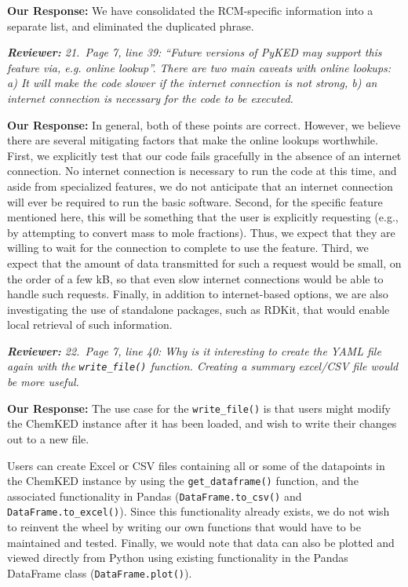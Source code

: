 \documentclass[a4paper,10pt]{elsarticle}
\newenvironment{reviewer}{\vspace{0.5\baselineskip}\begingroup\itshape\textbf{Reviewer:}}{\endgroup}
\newenvironment{response}{\textbf{Our Response:}}{\vspace{0.5\baselineskip}}
\begin{document}
\begin{response}
    We have consolidated the RCM-specific information into a separate list, and eliminated the
    duplicated phrase.
\end{response}

\begin{reviewer}
    21.~Page 7, line 39: ``Future versions of PyKED may support this feature via, e.g. online
    lookup''. There are two main caveats with online lookups: a) It will make the code slower if the
    internet connection is not strong, b) an internet connection is necessary for the code to be
    executed.
\end{reviewer}

\begin{response}
    In general, both of these points are correct. However, we believe there are several mitigating
    factors that make the online lookups worthwhile. First, we explicitly test that our code fails
    gracefully in the absence of an internet connection. No internet connection is necessary to run
    the code at this time, and aside from specialized features, we do not anticipate that an
    internet connection will ever be required to run the basic software. Second, for the specific
    feature mentioned here, this will be something that the user is explicitly requesting (e.g., by
    attempting to convert mass to mole fractions). Thus, we expect that they are willing to wait for
    the connection to complete to use the feature. Third, we expect that the amount of data
    transmitted for such a request would be small, on the order of a few kB, so that even slow
    internet connections would be able to handle such requests. Finally, in addition to
    internet-based options, we are also investigating the use of standalone packages, such as RDKit,
    that would enable local retrieval of such information.
\end{response}

\begin{reviewer}
    22.~Page 7, line 40: Why is it interesting to create the YAML file again with the
    \texttt{write\_file()} function. Creating a summary excel/CSV file would be more useful.
\end{reviewer}

\begin{response}
    The use case for the \texttt{write\_file()} is that users might modify the ChemKED instance
    after it has been loaded, and wish to write their changes out to a new file.

    Users can create Excel or CSV files containing all or some of the datapoints in the ChemKED
    instance by using the \verb|get_dataframe()| function, and the associated functionality in
    Pandas (\verb|DataFrame.to_csv()| and \verb|DataFrame.to_excel()|). Since this functionality
    already exists, we do not wish to reinvent the wheel by writing our own functions that would
    have to be maintained and tested. Finally, we would note that data can also be plotted and
    viewed directly from Python using existing functionality in the Pandas DataFrame class
    (\verb|DataFrame.plot()|).
\end{response}
\end{document}
